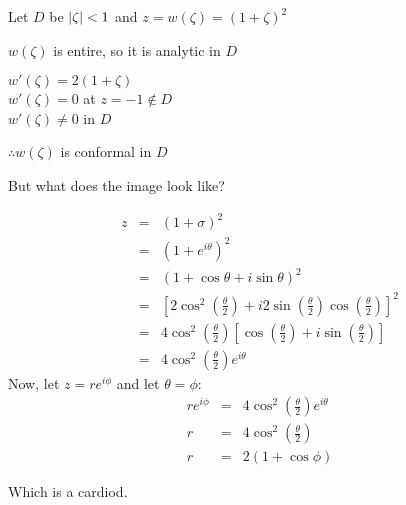 \documentclass[letterpaper,12pt,fleqn]{article}
\renewcommand{\o}{\theta}
\newcommand{\p}{\phi}
\newcommand{\z}{\zeta}
\newcommand{\s}{\sigma}
\begin{document}
\begin{example}
  Let $D$ be $\abs{\z}<1$ and $z=w(\z)=(1+\z)^2$

  $w(\z)$ is entire, so it is analytic in $D$

  $w'(\z)=2(1+\z)$ \\
  $w'(\z)=0$ at $z=-1\notin D$ \\
  $w'(\z)\ne 0$ in $D$

  $\therefore w(\z)$ is conformal in $D$

  But what does the image look like?

  \begin{minipage}{3in}
  \end{minipage}
  \begin{minipage}{3in}
  \end{minipage}
  \begin{eqnarray*}
    z &=& (1+\s)^2 \\
    &=& (1+e^{i\o})^2 \\
    &=& (1+\cos{\o}+i\sin{\o})^2 \\
    &=& \left[2\cos^2\left(\frac{\o}{2}\right)+
      i2\sin\left(\frac{\o}{2}\right)\cos\left(\frac{\o}{2}\right)\right]^2 \\
    &=& 4\cos^2\left(\frac{\o}{2}\right)\left[\cos\left(\frac{\o}{2}\right)+
      i\sin\left(\frac{\o}{2}\right)\right] \\
    &=& 4\cos^2\left(\frac{\o}{2}\right)e^{i\o}
  \end{eqnarray*}
  Now, let $z=re^{i\p}$ and let $\o=\p$:
  \begin{eqnarray*}
    re^{i\p} &=& 4\cos^2\left(\frac{\o}{2}\right)e^{i\o} \\
    r &=& 4\cos^2\left(\frac{\o}{2}\right) \\
    r &=& 2(1+\cos{\p})
  \end{eqnarray*}

  Which is a cardiod.
\end{example}
  
\end{document}
